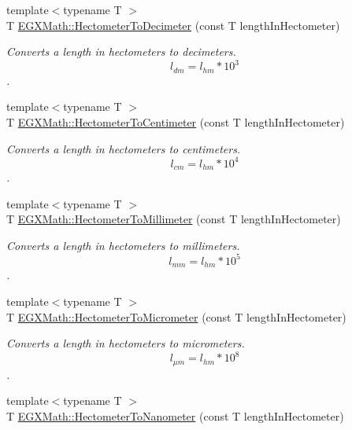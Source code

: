 \begin{DoxyCompactItemize}
{\footnotesize template$<$typename T $>$ }\\T \mbox{\hyperlink{group___e_g_x_math-_conversions-_length_conversions-_s_i-_hectometer-_s_i_ga41bf480cfd5b36671453de373251d171}{E\+G\+X\+Math\+::\+Hectometer\+To\+Decimeter}} (const T length\+In\+Hectometer)
\begin{DoxyCompactList}\small\item\em Converts a length in hectometers to decimeters. \[ l_{dm}=l_{hm} * 10^{3} \]. \end{DoxyCompactList}\item 
{\footnotesize template$<$typename T $>$ }\\T \mbox{\hyperlink{group___e_g_x_math-_conversions-_length_conversions-_s_i-_hectometer-_s_i_gace00e5f71f5c29d8022319c3bf63745d}{E\+G\+X\+Math\+::\+Hectometer\+To\+Centimeter}} (const T length\+In\+Hectometer)
\begin{DoxyCompactList}\small\item\em Converts a length in hectometers to centimeters. \[ l_{cm}=l_{hm} * 10^{4} \]. \end{DoxyCompactList}\item 
{\footnotesize template$<$typename T $>$ }\\T \mbox{\hyperlink{group___e_g_x_math-_conversions-_length_conversions-_s_i-_hectometer-_s_i_gaa4255093ded6f7cb739f3c519881c294}{E\+G\+X\+Math\+::\+Hectometer\+To\+Millimeter}} (const T length\+In\+Hectometer)
\begin{DoxyCompactList}\small\item\em Converts a length in hectometers to millimeters. \[ l_{mm}=l_{hm} * 10^{5} \]. \end{DoxyCompactList}\item 
{\footnotesize template$<$typename T $>$ }\\T \mbox{\hyperlink{group___e_g_x_math-_conversions-_length_conversions-_s_i-_hectometer-_s_i_ga3f5229b11d79e20007ac9320a317272a}{E\+G\+X\+Math\+::\+Hectometer\+To\+Micrometer}} (const T length\+In\+Hectometer)
\begin{DoxyCompactList}\small\item\em Converts a length in hectometers to micrometers. \[ l_{\mu m}=l_{hm} * 10^{8} \]. \end{DoxyCompactList}\item 
{\footnotesize template$<$typename T $>$ }\\T \mbox{\hyperlink{group___e_g_x_math-_conversions-_length_conversions-_s_i-_hectometer-_s_i_gac9e19002288731e06d492cc5f8ee0a0e}{E\+G\+X\+Math\+::\+Hectometer\+To\+Nanometer}} (const T length\+In\+Hectometer)

\end{DoxyCompactItemize}
